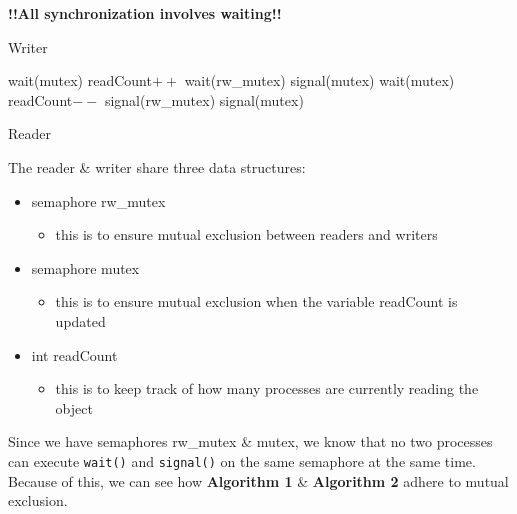 \documentclass{article}
\begin{document}
    \begin{center}
      {\color{red} \textbf{!!All synchronization involves waiting!!}}
    \end{center}

    \begin{multicols}{2}
      \begin{algorithm}[H]
      \caption{Writer}
      \end{algorithm}

      \vfill
      \columnbreak

      \begin{algorithm}[H]
         {
          wait(mutex)\;
          readCount$++$\;
           {
            wait(rw\_mutex)\;
          }
          signal(mutex)\;
          \label{cmt}
          wait(mutex)\;
          readCount$--$\;
           {
            signal(rw\_mutex)\;
          }
          signal(mutex)\;
        }
      \caption{Reader}
      \end{algorithm}
    \end{multicols}

    The reader \& writer share three data structures:

    \begin{itemize}
      \item semaphore rw\_mutex
      \begin{itemize}
        \item this is to ensure mutual exclusion between readers and writers
      \end{itemize}
      \item semaphore mutex
      \begin{itemize}
        \item this is to ensure mutual exclusion when the variable readCount is updated
      \end{itemize}
      \item int readCount
      \begin{itemize}
        \item this is to keep track of how many processes are currently reading the object
      \end{itemize}
    \end{itemize}

    Since we have semaphores rw\_mutex \& mutex, we know that no two processes can execute {\color{blue}\texttt{wait()}} and {\color{blue}\texttt{signal()}} on the same semaphore at the same time. Because of this, we can see how \textbf{Algorithm 1} \& \textbf{Algorithm 2} adhere to mutual exclusion. \\
\end{document}
